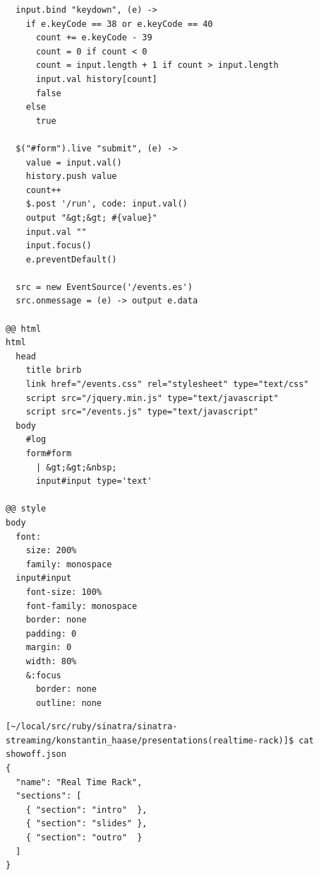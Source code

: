\begin{verbatim}
  input.bind "keydown", (e) ->
    if e.keyCode == 38 or e.keyCode == 40
      count += e.keyCode - 39
      count = 0 if count < 0
      count = input.length + 1 if count > input.length
      input.val history[count]
      false
    else
      true

  $("#form").live "submit", (e) ->
    value = input.val()
    history.push value
    count++
    $.post '/run', code: input.val()
    output "&gt;&gt; #{value}"
    input.val ""
    input.focus()
    e.preventDefault()

  src = new EventSource('/events.es')
  src.onmessage = (e) -> output e.data

@@ html
html
  head
    title brirb
    link href="/events.css" rel="stylesheet" type="text/css"
    script src="/jquery.min.js" type="text/javascript"
    script src="/events.js" type="text/javascript"
  body
    #log
    form#form
      | &gt;&gt;&nbsp;
      input#input type='text'

@@ style
body
  font:
    size: 200%
    family: monospace
  input#input
    font-size: 100%
    font-family: monospace
    border: none
    padding: 0
    margin: 0
    width: 80%
    &:focus
      border: none
      outline: none
\end{verbatim}


\begin{verbatim}
[~/local/src/ruby/sinatra/sinatra-streaming/konstantin_haase/presentations(realtime-rack)]$ cat showoff.json 
{
  "name": "Real Time Rack",
  "sections": [
    { "section": "intro"  },
    { "section": "slides" },
    { "section": "outro"  }
  ]
}
\end{verbatim}



